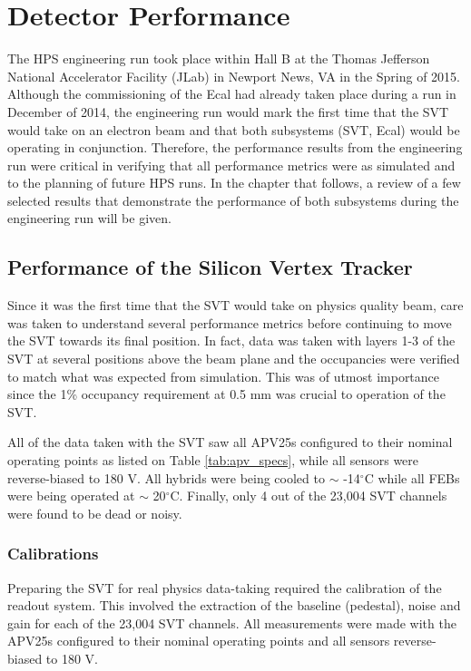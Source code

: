 
\chapter{Detector Performance}

The HPS engineering run took place within Hall B at the Thomas Jefferson 
National Accelerator Facility (JLab) in Newport News, VA in the Spring of 2015.
Although the commissioning of the Ecal had already taken place during a run in 
December of 2014, the engineering run would mark the first time that the SVT 
would take on an electron beam and that both subsystems (SVT, Ecal) would be operating in 
conjunction.  Therefore, the performance results from the engineering run were
critical in verifying that all performance metrics were as simulated and to the
planning of future HPS runs.  In the chapter that follows, a review of a few
selected results that demonstrate the performance of both subsystems during the
engineering run will be given.

\section{Performance of the Silicon Vertex Tracker}

Since it was the first time that the SVT would take on physics quality beam, 
care was taken to understand several performance metrics before continuing to
move the SVT towards its final position. 
In fact, data was taken with layers 1-3 of the SVT at several positions above the
beam plane and the occupancies were verified
to match what was expected from simulation.  This was of utmost  
importance since the 1\% occupancy requirement at 0.5 mm was crucial to operation of the
SVT. 

All of the data taken with the SVT saw all APV25s configured to their nominal
operating points as listed on Table \ref{tab:apv_specs}, while all sensors were reverse-biased
to 180 V. All hybrids were being cooled to $\sim$ -14$^{\circ}$C while all FEBs
were being operated at $\sim$ 20$^{\circ}$C.  Finally, only 4 out of the 23,004
SVT channels were found to be dead or noisy.

\subsection{Calibrations}

Preparing the SVT for real physics data-taking required the calibration of the
readout system. This involved the extraction of the baseline 
(pedestal), noise and gain for each of the 23,004 SVT channels.  All 
measurements were made with the APV25s configured to their nominal operating
points and all sensors reverse-biased to 180 V.

